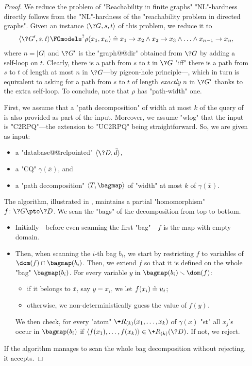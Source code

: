 \begin{proof}
	We reduce the problem of "Reachability in finite graphs"
	"NL"-hardness directly follows from the "NL"-hardness of
	the "reachability problem in directed graphs".
	Given an instance $\tup{\?G,s,t}$ of this problem,
	we reduce it to
	\[
		\tup{\?G', s, t} \FOmodels^?
		\rho(x_1,x_n) \defeq x_1 \to x_2 \land x_2 \to x_3 \land \dotsc \land x_{n-1} \to x_n,
	\]
	where $n = |G|$ and $\?G'$ is the "graph@@dir" obtained
	from $\?G$ by adding a self-loop on $t$.
	Clearly, there is a path from $s$ to $t$
	in $\?G$ "iff" there is a path from $s$ to $t$ of length at most $n$ in $\?G$---by pigeon-hole principle---, which in turn is equivalent to asking for a path from $s$ to $t$
	of length \emph{exactly} $n$ in $\?G'$ thanks to the extra self-loop.
	To conclude, note that $\rho$ has "path-width" one.

	First, we assume that a "path decomposition" of width at most $k$ of the query of
	is also provided as part of the input. Moreover, we assume "wlog" that the input is "C2RPQ"---the extension to "UC2RPQ" being straightforward. So, we are given as input:
	\begin{itemize}
		\item a "database@@relpointed" $\tup{\?D, \bar d}$,
		\item a "CQ" $\gamma(\bar x)$, and
		\item a "path decomposition" $\langle T, \bagmap \rangle$ of "width" at 	
			most $k$ of $\gamma(\bar x)$.
	\end{itemize}
	The algorithm, illustrated in , maintains a partial "homomorphism"
	$f\colon \?G \pto \?D$.
	We scan the "bags" of the decomposition from top to bottom.
	\begin{itemize}
		\item Initially---before even scanning the first "bag"---$f$ is the map with empty domain.
		\item Then, when scanning the $i$-th bag $b_i$,
			we start by restricting $f$ to variables of $\dom(f)\cap \bagmap(b_i)$.
			Then, we extend $f$ so that it is defined on the whole "bag" $\bagmap(b_i)$.
			For every variable $y$ in $\bagmap(b_i) \smallsetminus\dom(f)$:
			\begin{itemize}
				\item if it belongs to $\bar x$, say $y = x_i$, 
					we let $f(x_i) \mathrel{\hat{=}} u_i$;
				\item otherwise, we non-deterministically guess the value of $f(y)$.
			\end{itemize}
			We then check, for every "atom" $\+R_{(k)}(x_1,\hdots,x_k)$ of $\gamma(\bar x)$ 
			"st" all $x_j$'s occur in $\bagmap(b_i)$ if
			$\tup{f(x_1), \dotsc, f(x_k)} \in \+R_{(k)}(\?D)$.
			If not, we reject. 
	\end{itemize}
	If the algorithm manages to scan the whole bag decomposition without rejecting, it accepts.


\end{proof}
